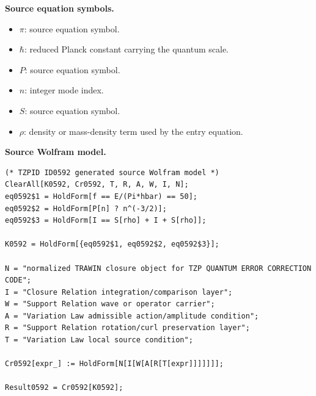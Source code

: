 \begin{minipage}[t]{0.49\linewidth}
\begingroup
\small
\raggedright
\textbf{Source equation symbols.}\par
\begin{itemize}[leftmargin=1.35em,itemsep=1pt,topsep=1pt,parsep=0pt]
    \item $\pi$: source equation symbol.
    \item $\hbar$: reduced Planck constant carrying the quantum scale.
    \item $P$: source equation symbol.
    \item $n$: integer mode index.
    \item $S$: source equation symbol.
    \item $\rho$: density or mass-density term used by the entry equation.
\end{itemize}
\endgroup
\end{minipage}\hfill
\begin{minipage}[t]{0.47\linewidth}
\begingroup
\scriptsize
\raggedright
\textbf{Source Wolfram model.}\par
\begin{Verbatim}[fontsize=\tiny,breaklines=true,breakanywhere=true]
(* TZPID ID0592 generated source Wolfram model *)
ClearAll[K0592, Cr0592, T, R, A, W, I, N];
eq0592$1 = HoldForm[f == E/(Pi*hbar) == 50];
eq0592$2 = HoldForm[P[n] ? n^(-3/2)];
eq0592$3 = HoldForm[I == S[rho] + I + S[rho]];

K0592 = HoldForm[{eq0592$1, eq0592$2, eq0592$3}];

N = "normalized TRAWIN closure object for TZP QUANTUM ERROR CORRECTION CODE";
I = "Closure Relation integration/comparison layer";
W = "Support Relation wave or operator carrier";
A = "Variation Law admissible action/amplitude condition";
R = "Support Relation rotation/curl preservation layer";
T = "Variation Law local source condition";

Cr0592[expr_] := HoldForm[N[I[W[A[R[T[expr]]]]]]];

Result0592 = Cr0592[K0592];
\end{Verbatim}
\endgroup
\end{minipage}

